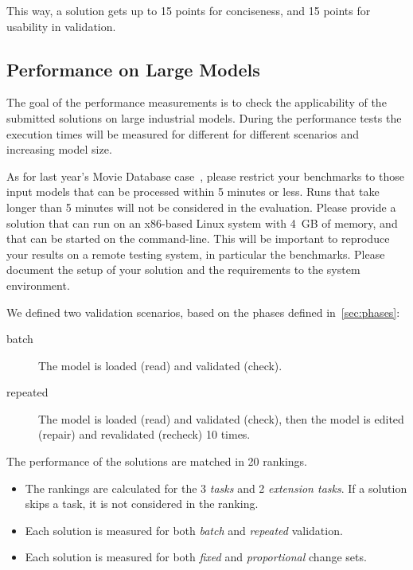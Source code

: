 \documentclass[submission,copyright,creativecommons]{eptcs}
\begin{document}
This way, a solution gets up to 15 points for conciseness, and 15 points for usability in validation.

\noindent{}

\noindent{}

\subsection{Performance on Large Models}
The goal of the performance measurements is to check the applicability of the submitted solutions on large industrial models. During the performance tests the execution times will be measured for different for different scenarios and increasing model size.

As for last year's Movie Database case~\cite{horn2014ttc}, please restrict your benchmarks to those input models that can be processed within 5 minutes or less. Runs that take longer than 5 minutes will not be considered in the evaluation. Please provide a solution that can run on an x86-based Linux system with 4~GB of memory, and that can be started on the command-line. This will be important to reproduce your results on a remote testing system, in particular the benchmarks. Please document the setup of your solution and the requirements to the system environment.

We defined two validation scenarios, based on the phases defined in~\autoref{sec:phases}:

\begin{description}
\item[batch] The model is loaded (\textsf{read}) and validated (\textsf{check}).
\item[repeated] The model is loaded (\textsf{read}) and validated (\textsf{check}), then the model is edited (\textsf{repair}) and revalidated (\textsf{recheck}) 10 times.
\end{description}


The performance of the solutions are matched in 20 rankings.

\begin{itemize}
  \item The rankings are calculated for the 3 \emph{tasks} and 2 \emph{extension tasks}. If a solution skips a task, it is not considered in the ranking.
  \item Each solution is measured for both \emph{batch} and \emph{repeated} validation.
  \item Each solution is measured for both \emph{fixed} and \emph{proportional} change sets.
\end{itemize}
\end{document}
